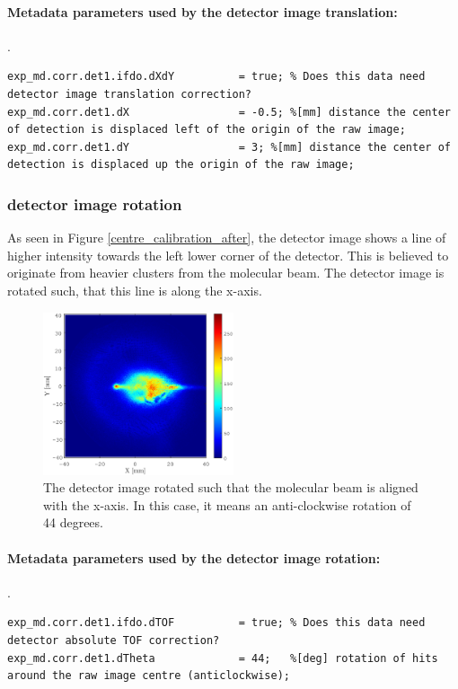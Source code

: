 \paragraph{Metadata parameters used by the detector image translation:}
.\newline
\lstset{language=MATLAB}
\begin{lstlisting}
exp_md.corr.det1.ifdo.dXdY 			= true; % Does this data need detector image translation correction?
exp_md.corr.det1.dX					= -0.5; %[mm] distance the center of detection is displaced left of the origin of the raw image; 
exp_md.corr.det1.dY					= 3; %[mm] distance the center of detection is displaced up the origin of the raw image;
\end{lstlisting}

\subsubsection{detector image rotation}
As seen in Figure \ref{centre_calibration_after}, the detector image shows a line of higher intensity towards the left lower corner of the detector. This is believed to originate from heavier clusters from the molecular beam. The detector image is rotated such, that this line is along the x-axis. 

\begin{figure}[h]
   \centering
    \centerline{\includegraphics[width=0.5\textwidth]{Graphics/rotation_after.eps}}
\caption{The detector image rotated such that the molecular beam is aligned with the x-axis. In this case, it means an anti-clockwise rotation of 44 degrees.}
\label{Data_structure_schematic}
\end{figure}

\paragraph{Metadata parameters used by the detector image rotation:}
.\newline
\lstset{language=MATLAB}
\begin{lstlisting}
exp_md.corr.det1.ifdo.dTOF  		= true; % Does this data need detector absolute TOF correction?
exp_md.corr.det1.dTheta				= 44;   %[deg] rotation of hits around the raw image centre (anticlockwise);
\end{lstlisting}

